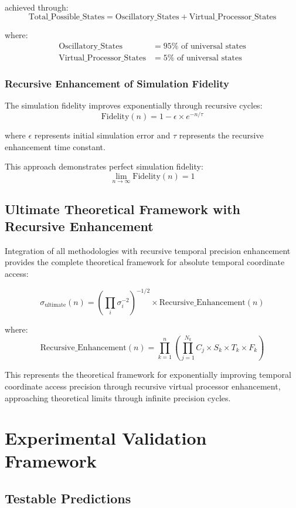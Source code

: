 \documentclass[12pt,a4paper]{article}
\begin{document}
{{{{{{achieved through:
$$\text{Total\_Possible\_States} = \text{Oscillatory\_States} + \text{Virtual\_Processor\_States}$$

where:
\begin{align}
\text{Oscillatory\_States} &= 95\% \text{ of universal states} \\
\text{Virtual\_Processor\_States} &= 5\% \text{ of universal states}
\end{align}

\subsubsection{Recursive Enhancement of Simulation Fidelity}

The simulation fidelity improves exponentially through recursive cycles:
$$\text{Fidelity}(n) = 1 - \epsilon \times e^{-n/\tau}$$

where $\epsilon$ represents initial simulation error and $\tau$ represents the recursive enhancement time constant.

This approach demonstrates perfect simulation fidelity:
$$\lim_{n \to \infty} \text{Fidelity}(n) = 1$$

\subsection{Ultimate Theoretical Framework with Recursive Enhancement}

Integration of all methodologies with recursive temporal precision enhancement provides the complete theoretical framework for absolute temporal coordinate access:

$$\sigma_{\text{ultimate}}(n) = \left(\prod_{i} \sigma_i^{-2}\right)^{-1/2} \times \text{Recursive\_Enhancement}(n)$$

where:
$$\text{Recursive\_Enhancement}(n) = \prod_{k=1}^{n} \left(\prod_{j=1}^{N_k} C_j \times S_k \times T_k \times F_k\right)$$

This represents the theoretical framework for exponentially improving temporal coordinate access precision through recursive virtual processor enhancement, approaching theoretical limits through infinite precision cycles.

\section{Experimental Validation Framework}

\subsection{Testable Predictions}

}}}}}}
\end{document}

